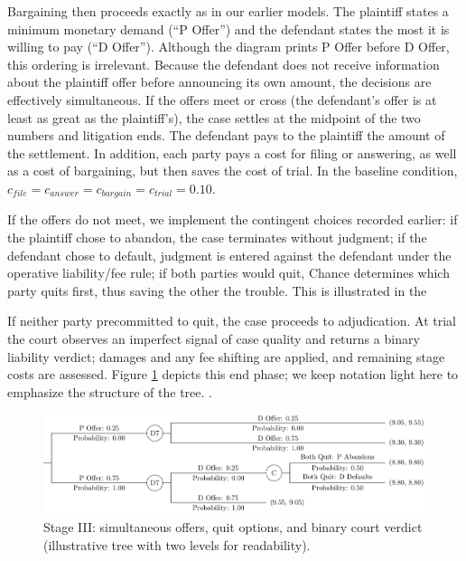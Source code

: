 \documentclass{article}
\begin{document}
Bargaining then proceeds exactly as in our earlier models. The plaintiff states a minimum monetary demand (“P Offer”) and the defendant states the most it is willing to pay (“D Offer”). Although the diagram prints P Offer before D Offer, this ordering is irrelevant. Because the defendant does not receive information about the plaintiff offer before announcing its own amount, the decisions are effectively simultaneous. If the offers meet or cross (the defendant's offer is at least as great as the plaintiff's), the case settles at the midpoint of the two numbers and litigation ends. The defendant pays to the plaintiff the amount of the settlement. In addition, each party pays a cost for filing or answering, as well as a cost of bargaining, but then saves the cost of trial. In the baseline condition, $c_{file} = c_{answer} = c_{bargain} = c_{trial} = 0.10$.

If the offers do not meet, we implement the contingent choices recorded earlier: if the plaintiff chose to abandon, the case terminates without judgment; if the defendant chose to default, judgment is entered against the defendant under the operative liability/fee rule; if both parties would quit, Chance determines which party quits first, thus saving the other the trouble. This is illustrated in the 

If neither party precommitted to quit, the case proceeds to adjudication. At trial the court observes an imperfect signal of case quality and returns a binary liability verdict; damages and any fee shifting are applied, and remaining stage costs are assessed. Figure \ref{fig:smalltree_end.pdf} depicts this end phase; we keep notation light here to emphasize the structure of the tree.
.



  \begin{figure}[t]
    \centering
    \includegraphics[width=\textwidth]{../Figures/smalltree_end.pdf}
    \caption{Stage III: simultaneous offers, quit options, and binary court verdict (illustrative tree with two levels for readability).}
    \label{fig:smalltree_end.pdf}
  \end{figure}
\end{document}
